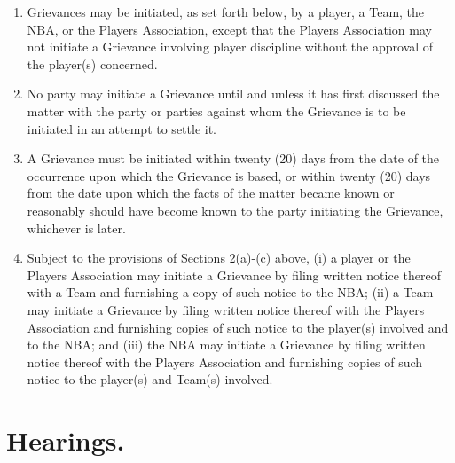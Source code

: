 \documentclass[
]{book}
\providecommand{\tightlist}{%
  \setlength{\itemsep}{0pt}\setlength{\parskip}{0pt}}
\begin{document}
\begin{enumerate}
\def\labelenumi{(\alph{enumi})}
\tightlist
\item
  Grievances may be initiated, as set forth below, by a player, a Team, the NBA, or the Players Association, except that the Players Association may not initiate a Grievance involving player discipline without the approval of the player(s) concerned.
\item
  No party may initiate a Grievance until and unless it has first discussed the matter with the party or parties against whom the Grievance is to be initiated in an attempt to settle it.
\item
  A Grievance must be initiated within twenty (20) days from the date of the occurrence upon which the Grievance is based, or within twenty (20) days from the date upon which the facts of the matter became known or reasonably should have become known to the party initiating the Grievance, whichever is later.
\item
  Subject to the provisions of Sections 2(a)-(c) above, (i) a player or the Players Association may initiate a Grievance by filing written notice thereof with a Team and furnishing a copy of such notice to the NBA; (ii) a Team may initiate a Grievance by filing written notice thereof with the Players Association and furnishing copies of such notice to the player(s) involved and to the NBA; and (iii) the NBA may initiate a Grievance by filing written notice thereof with the Players Association and furnishing copies of such notice to the player(s) and Team(s) involved.
\end{enumerate}

\hypertarget{hearings.}{%
\section{Hearings.}\label{hearings.}}
\end{document}
